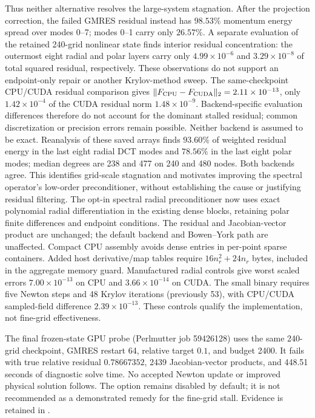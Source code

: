 \documentclass[aps,prd,preprint,notitlepage,nofootinbib]{revtex4-2}
\begin{document}
Thus neither alternative resolves the large-system stagnation.
After the projection correction, the failed GMRES residual instead has
$98.53\%$ momentum energy spread over modes 0--7; modes 0--1 carry only
$26.57\%$. A separate evaluation of the retained 240-grid nonlinear state
finds interior residual concentration: the outermost eight radial and polar
layers carry only $4.99\times10^{-6}$ and $3.29\times10^{-8}$ of total squared
residual, respectively. These observations do not support an endpoint-only
repair or another Krylov-method sweep. The same-checkpoint CPU/CUDA residual
comparison gives $\|F_{\rm CPU}-F_{\rm CUDA}\|_2=2.11\times10^{-13}$, only
$1.42\times10^{-4}$ of the CUDA residual norm $1.48\times10^{-9}$.
Backend-specific evaluation differences therefore do not account for the
dominant stalled residual; common discretization or precision errors remain
possible. Neither backend is assumed to be exact.
Reanalysis of these saved arrays finds $93.60\%$ of weighted residual energy
in the last eight radial DCT modes and $78.56\%$ in the last eight polar modes;
median degrees are 238 and 477 on 240 and 480 nodes. Both backends agree.
This identifies grid-scale stagnation and motivates improving the spectral
operator's low-order preconditioner, without establishing the cause or
justifying residual filtering.
The opt-in spectral radial preconditioner now uses exact polynomial radial
 differentiation in the existing dense blocks, retaining polar finite differences
 and endpoint conditions. The residual and Jacobian-vector product are unchanged;
 the default backend and Bowen--York path are unaffected. Compact CPU assembly
 avoids dense entries in per-point sparse containers. Added host derivative/map
 tables require $16n_r^2+24n_r$ bytes, included in the aggregate memory guard.
 Manufactured radial controls give worst scaled errors $7.00\times10^{-13}$
 on CPU and $3.66\times10^{-14}$ on CUDA. The small binary requires five Newton
 steps and 48 Krylov iterations (previously 53), with CPU/CUDA sampled-field
 difference $2.39\times10^{-13}$. These controls qualify the implementation,
 not fine-grid effectiveness.

The final frozen-state GPU probe (Perlmutter job 59426128) uses the same
 240-grid checkpoint, GMRES restart 64, relative target $0.1$, and budget 2400.
 It fails with true relative residual $0.78667352$, 2439 Jacobian-vector products,
 and 448.51 seconds of diagnostic solve time. No accepted Newton update or
 improved physical solution follows. The option remains disabled by default;
 it is not recommended as a demonstrated remedy for the fine-grid stall.
 Evidence is retained in
 .
\end{document}
